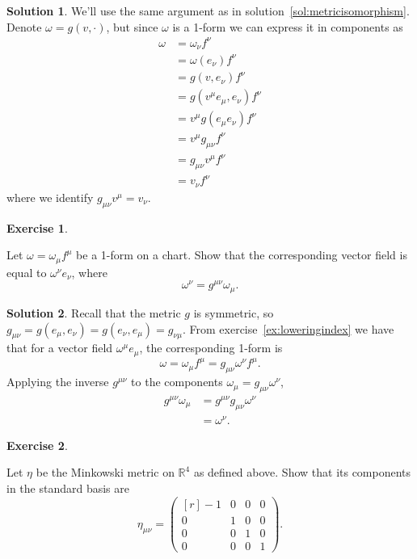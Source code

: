 \documentclass[11pt, a4paper]{report}
\theoremstyle{definition}
\newtheorem{exercise}{Exercise}[part]
\newtheorem{solution}{Solution}[part]
\newenvironment{ex}{\begin{exercise}}{\end{exercise}\pagebreak[1]}
\newenvironment{sol}{\begin{solution}}{\end{solution}\pagebreak[3]}
\begin{document}
\begin{sol}

We'll use the same argument as in solution~\ref{sol:metricisomorphism}. Denote $\omega = g(v, \cdot)$, but since $\omega$ is a 1-form we can express it in components as
\begin{align*}
    \omega &= \omega_\nu f^\nu \\
           &= \omega(e_\nu) f^\nu \\
           &= g(v, e_\nu) f^\nu \\
           &= g(v^\mu e_\mu, e_\nu) f^\nu \\
           &= v^\mu g(e_\mu e_\nu) f^\nu \\
           &= v^\mu g_{\mu\nu} f^\nu \\
           &= g_{\mu\nu} v^\mu f^\nu \\
           &= v_\nu f^\nu
\end{align*}
where we identify $g_{\mu\nu}v^\mu = v_\nu$.

\end{sol}

\begin{ex}\label{ex:raisingindex}

Let $\omega = \omega_\mu f^\mu$ be a 1-form on a chart. Show that the corresponding vector field is equal to $\omega^\nu e_\nu$, where
\[
    \omega^\nu = g^{\mu\nu} \omega_\mu.
\]

\end{ex}

\begin{sol}

Recall that the metric $g$ is symmetric, so $g_{\mu\nu} = g(e_\mu, e_\nu) = g(e_\nu, e_\mu) = g_{\nu\mu}$.
From exercise~\ref{ex:loweringindex} we have that for a vector field $\omega^\mu e_\mu$, the corresponding 1-form is
\[
    \omega = \omega_\mu f^\mu = g_{\mu\nu}\omega^\nu f^\mu.
\]
Applying the inverse $g^{\mu\nu}$ to the components $\omega_\mu = g_{\mu\nu}\omega^\nu$,
\begin{align*}
    g^{\mu\nu} \omega_\mu &= g^{\mu\nu} g_{\mu\nu} \omega^\nu \\
                          &= \omega^\nu.
\end{align*}

\end{sol}

\begin{ex}\label{ex:minkowskimetric}

Let $\eta$ be the Minkowski metric on $\mathbb{R}^4$ as defined above.
Show that its components in the standard basis are
\[
    \eta_{\mu\nu} = \begin{pmatrix*}[r]
            -1 & 0 & 0 & 0 \\
            0 & 1 & 0 & 0 \\
            0 & 0 & 1 & 0 \\
            0 & 0 & 0 & 1
        \end{pmatrix*}.
\]

\end{ex}
\end{document}
